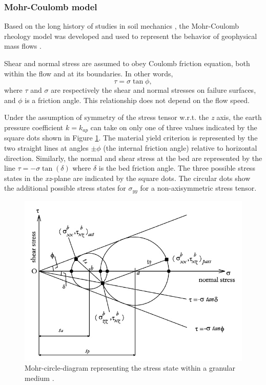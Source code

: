 \documentclass{article}
\begin{document}
\subsubsection{Mohr-Coulomb model}\label{MCM}
Based on the long history of studies in soil mechanics \citep{Rankine1857}, the Mohr-Coulomb rheology model was developed and used to represent the behavior of geophysical mass flows \cite{SavageHutter1989}.

Shear and normal stress are assumed to obey Coulomb friction equation, both within the flow and at its boundaries. In other words,
\begin{equation}
\tau = \sigma \tan \phi,
\end{equation}
where $\tau$ and $\sigma$ are respectively the shear and normal stresses on failure surfaces, and $\phi$ is a friction angle. This relationship does not depend on the flow speed.

Under the assumption of symmetry of the stress tensor w.r.t. the \textit{z} axis, the earth pressure coefficient $k=k_{ap}$ can take on only one of three values indicated by the square dots shown in Figure \ref{mohr_circle}. The material yield criterion is represented by the two straight lines at angles $\pm \phi$ (the internal friction angle) relative to horizontal direction. Similarly, the normal and shear stress at the bed are represented by the line $\tau=-\sigma \tan(\delta)$ where $\delta$ is the bed friction angle. The three possible stress states in the \textit{xz}-plane are indicated by the square dots. The circular dots show the additional possible stress states for $\sigma_{yy}$ for a non-axisymmetric stress tensor.

\begin{figure}[H]
        \centering
        \includegraphics[width=.7\textwidth]{Figures/mohr.jpg}
        \caption{Mohr-circle-diagram representing the stress state within a granular medium \citep{Pirulli2007}.}
        \label{mohr_circle}
\end{figure}
\end{document}
